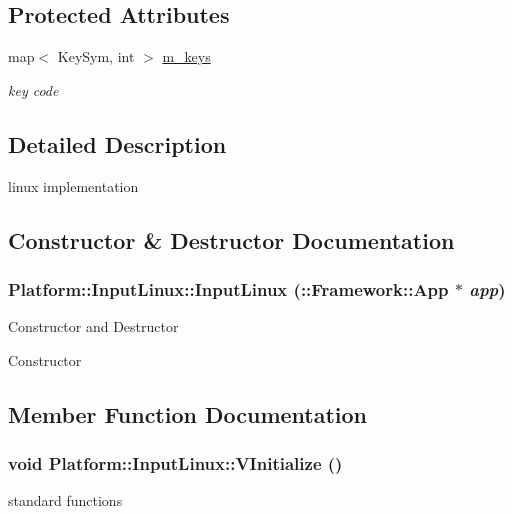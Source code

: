 \subsection*{Protected Attributes}
\begin{DoxyCompactItemize}
\item 
\hypertarget{classPlatform_1_1InputLinux_aa91e547e033375db04e059baa898ddf6}{
map$<$ KeySym, int $>$ \hyperlink{classPlatform_1_1InputLinux_aa91e547e033375db04e059baa898ddf6}{m\_\-keys}}
\label{classPlatform_1_1InputLinux_aa91e547e033375db04e059baa898ddf6}

\begin{DoxyCompactList}\small\item\em key code \item\end{DoxyCompactList}\end{DoxyCompactItemize}


\subsection{Detailed Description}
linux implementation 

\subsection{Constructor \& Destructor Documentation}
\hypertarget{classPlatform_1_1InputLinux_a378a85280fe380056552c82130299f59}{
\subsubsection[{InputLinux}]{\setlength{\rightskip}{0pt plus 5cm}Platform::InputLinux::InputLinux (::{\bf Framework::App} $\ast$ {\em app})}}
\label{classPlatform_1_1InputLinux_a378a85280fe380056552c82130299f59}
Constructor and Destructor

Constructor 

\subsection{Member Function Documentation}
\hypertarget{classPlatform_1_1InputLinux_a7197f730a72f6ff7c3f8e98705cfe922}{
\subsubsection[{VInitialize}]{\setlength{\rightskip}{0pt plus 5cm}void Platform::InputLinux::VInitialize ()}}
\label{classPlatform_1_1InputLinux_a7197f730a72f6ff7c3f8e98705cfe922}
standard functions

